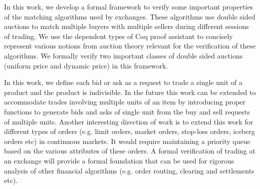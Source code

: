 \documentclass[a4paper,UKenglish,cleveref, autoref]{lipics-v2019}
\begin{document}
In this work, we develop a formal framework to verify some important properties of the matching algorithms used by exchanges. These algorithms use double sided auctions to match multiple buyers with multiple sellers during different sessions of trading. We use the dependent types of Coq proof assistant to concisely represent various notions from auction theory relevant for the verification of these algorithms. We formally verify two important classes of double sided auctions (uniform price and dynamic price) in this framework. 

In this work, we define each bid or ask as a request to trade a single unit of a product and the product is indivisible. In the future this work can be extended to accommodate trades involving multiple units of an item by introducing proper functions to generate bids and asks of single unit from the buy and sell requests of multiple units. Another interesting direction of work is to extend this work for different types of orders (e.g. limit orders, market orders, stop-loss orders, iceberg orders etc) in continuous markets. It would require maintaining a priority queue based on the various attributes of these orders. A formal verification of trading at an exchange will provide a formal foundation that can be used for rigorous analysis of other financial algorithms (e.g. order routing, clearing and settlements etc).



\end{document}
